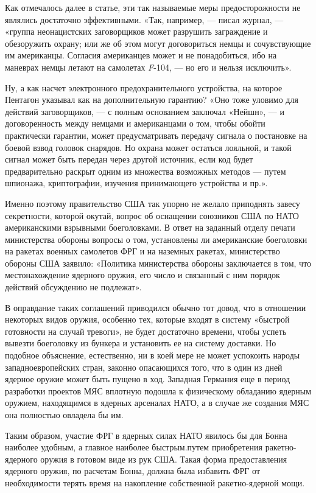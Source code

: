 \documentclass[12pt, a4paper, openany]{book}
\begin{document}
	Как отмечалось далее в статье, эти так называемые меры предосторожности не являлись достаточно эффективными. «Так, например, — писал журнал, — «группа неонацистских заговорщиков может разрушить заграждение и обезоружить охрану; или же об этом могут договориться немцы и сочувствующие им американцы. Согласия американцев может и не понадобиться, ибо на маневрах немцы летают на самолетах \textit{F}-104, — но его и нельзя исключить».
	
	Ну, а как насчет электронного предохранительного  устройства, на которое Пентагон указывал как на дополнительную гарантию? «Оно тоже уловимо для действий заговорщиков, — с полным основанием заключал «Нейшн», — и договоренность между немцами и американцами о том, чтобы обойти  практически гарантии, может предусматривать передачу сигнала о постановке на боевой взвод головок снарядов. Но охрана может остаться лояльной, и такой сигнал может быть передан через другой источник, если код будет предварительно  раскрыт одним из множества возможных методов — путем  шпионажа, криптографии, изучения принимающего устройства и пр.».
	
	Именно поэтому правительство США так упорно не желало приподнять завесу секретности, которой окутай,  вопрос об оснащении союзников США по НАТО американскими взрывными боеголовками. В ответ на заданный отделу печати министерства обороны вопросы о том, установлены ли  американские боеголовки на ракетах военных самолетов ФРГ и на наземных ракетах, министерство обороны США заявило:  «Политика министерства обороны заключается в том, что  местонахождение ядерного оружия, его число и связанный с ним  порядок действий обсуждению не подлежат».
	
	В оправдание таких соглашений приводился обычно тот довод, что в отношении некоторых видов оружия, особенно тех, которые входят в систему «быстрой готовности на случай тревоги», не будет достаточно времени, чтобы успеть вывезти боеголовку из бункера и установить ее на систему доставки. Но подобное объяснение, естественно, ни в коей мере не может успокоить народы западноевропейских стран, законно  опасающихся того, что в один из дней ядерное оружие может быть пущено в ход. Западная Германия еще в период разработки проектов МЯС вплотную подошла к физическому обладанию ядерным оружием, находящимся в ядерных арсеналах НАТО, а в случае же создания МЯС она полностью овладела бы им.
	
	Таким образом, участие ФРГ в ядерных силах НАТО  явилось бы для Бонна наиболее удобным, а главное наиболее  быстрым.путем приобретения ракетно-ядерного оружия в готовом виде из рук США. Такая форма предоставления ядерного  оружия, по расчетам Бонна, должна была избавить ФРГ от  необходимости терять время на накопление собственной ракетно-ядерной мощи.
	
\end{document}
